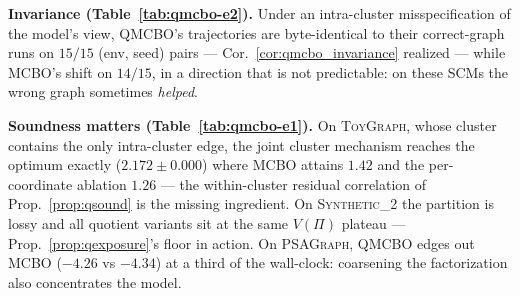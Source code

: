 \documentclass[twoside]{article}
\newcommand{\QMCBO}{\textsc{QMCBO}}
\begin{document}
\textbf{Invariance (Table~\ref{tab:qmcbo-e2}).} Under an intra-cluster misspecification of the model's view, \QMCBO{}'s trajectories are byte-identical to their correct-graph runs on $15/15$ (env, seed) pairs --- Cor.~\ref{cor:qmcbo_invariance} realized --- while MCBO's shift on $14/15$, in a direction that is not predictable: on these SCMs the wrong graph sometimes \emph{helped}.

\textbf{Soundness matters (Table~\ref{tab:qmcbo-e1}).} On \textsc{ToyGraph}, whose cluster contains the only intra-cluster edge, the joint cluster mechanism reaches the optimum exactly ($2.172{\pm}0.000$) where MCBO attains $1.42$ and the per-coordinate ablation $1.26$ --- the within-cluster residual correlation of Prop.~\ref{prop:qsound} is the missing ingredient. On \textsc{Synthetic\_2} the partition is lossy and all quotient variants sit at the same $V(\Pi)$ plateau --- Prop.~\ref{prop:qexposure}'s floor in action. On \textsc{PSAGraph}, \QMCBO{} edges out MCBO ($-4.26$ vs $-4.34$) at a third of the wall-clock: coarsening the factorization also concentrates the model.

\begin{table}[t]\centering
  \caption{\QMCBO{} vs MCBO (its own harness and protocol; $5$ seeds, $T{=}100$). Final $Y$ (all tasks maximized) and wall-clock per unit. \QMCBO{}-ind is the per-coordinate ablation of Prop.~\ref{prop:qsound}.}
  \label{tab:qmcbo-e1}
  \small
\end{table}

\begin{table}[t]\centering
  \caption{Invariance under an intra-cluster misspecification of the model's graph view (same seeds, deterministic runs): trajectories byte-identical to the correct-graph run, and mean $|\Delta \text{final}|$. \QMCBO{} cannot move (Theorem~\ref{thm:contract}); MCBO does.}
  \label{tab:qmcbo-e2}
  \small
\end{table}

\end{document}
